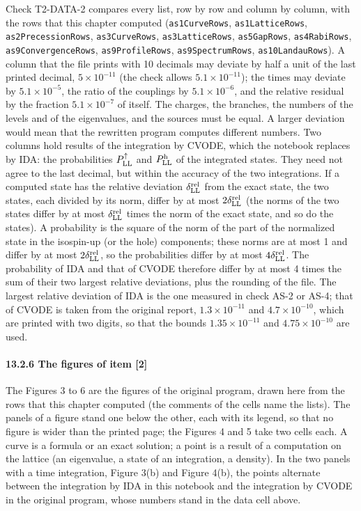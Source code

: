 \documentclass[
  10pt,
]{article}
\begin{document}
Check T2-DATA-2 compares every list, row by row and column by column,
with the rows that this chapter computed (\texttt{as1CurveRows},
\texttt{as1LatticeRows}, \texttt{as2PrecessionRows},
\texttt{as3CurveRows}, \texttt{as3LatticeRows}, \texttt{as5GapRows},
\texttt{as4RabiRows}, \texttt{as9ConvergenceRows},
\texttt{as9ProfileRows}, \texttt{as9SpectrumRows},
\texttt{as10LandauRows}). A column that the file prints with 10 decimals
may deviate by half a unit of the last printed decimal,
\(5\times10^{-11}\) (the check allows \(5.1\times10^{-11}\)); the times
may deviate by \(5.1\times10^{-5}\), the ratio of the couplings by
\(5.1\times10^{-6}\), and the relative residual by the fraction
\(5.1\times10^{-7}\) of itself. The charges, the branches, the numbers
of the levels and of the eigenvalues, and the sources must be equal. A
larger deviation would mean that the rewritten program computes
different numbers. Two columns hold results of the integration by CVODE,
which the notebook replaces by IDA: the probabilities
\(P^\uparrow_{\rm LL}\) and \(P^{\rm h}_{\rm LL}\) of the integrated
states. They need not agree to the last decimal, but within the accuracy
of the two integrations. If a computed state has the relative deviation
\(\delta^{\rm rel}_{\rm LL}\) from the exact state, the two states, each
divided by its norm, differ by at most \(2\delta^{\rm rel}_{\rm LL}\)
(the norms of the two states differ by at most
\(\delta^{\rm rel}_{\rm LL}\) times the norm of the exact state, and so
do the states). A probability is the square of the norm of the part of
the normalized state in the isospin-up (or the hole) components; these
norms are at most 1 and differ by at most
\(2\delta^{\rm rel}_{\rm LL}\), so the probabilities differ by at most
\(4\delta^{\rm rel}_{\rm LL}\). The probability of IDA and that of CVODE
therefore differ by at most 4 times the sum of their two largest
relative deviations, plus the rounding of the file. The largest relative
deviation of IDA is the one measured in check AS-2 or AS-4; that of
CVODE is taken from the original report, \(1.3\times10^{-11}\) and
\(4.7\times10^{-10}\), which are printed with two digits, so that the
bounds \(1.35\times10^{-11}\) and \(4.75\times10^{-10}\) are used.

\hypertarget{the-figures-of-item-2}{%
\paragraph{13.2.6 The figures of item
{[}2{]}}\label{the-figures-of-item-2}}

The Figures 3 to 6 are the figures of the original program, drawn here
from the rows that this chapter computed (the comments of the cells name
the lists). The panels of a figure stand one below the other, each with
its legend, so that no figure is wider than the printed page; the
Figures 4 and 5 take two cells each. A curve is a formula or an exact
solution; a point is a result of a computation on the lattice (an
eigenvalue, a state of an integration, a density). In the two panels
with a time integration, Figure 3(b) and Figure 4(b), the points
alternate between the integration by IDA in this notebook and the
integration by CVODE in the original program, whose numbers stand in the
data cell above.
\end{document}
